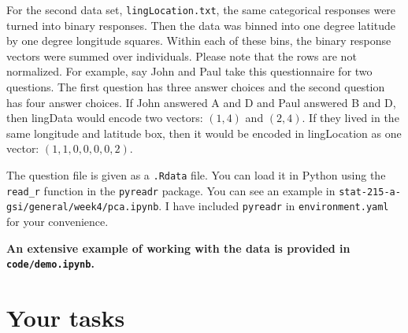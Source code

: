 \documentclass[letterpaper,12pt]{article}
\begin{document}
For the second data set, \texttt{lingLocation.txt}, the same categorical responses were turned into binary responses. Then the data was binned into one degree latitude by one degree longitude squares. Within each of these bins, the binary response vectors were summed over individuals. Please note that the rows are not normalized. For example, say John and Paul take this questionnaire for two questions. The first question has three answer choices and the second question has four answer choices. If John answered A and D and Paul answered B and D, then lingData would encode two vectors: $(1, 4)$ and $(2, 4)$. If they lived in the same longitude and latitude box, then it would be encoded in lingLocation as one vector: $(1, 1, 0, 0, 0, 0, 2)$.

The question file is given as a \texttt{.Rdata} file. You can load it in Python using the \texttt{read\_r} function in the \texttt{pyreadr} package. You can see an example in \texttt{stat-215-a-gsi/general/week4/pca.ipynb}. I have included \texttt{pyreadr} in \texttt{environment.yaml} for your convenience.

\textbf{An extensive example of working with the data is provided in \texttt{code/demo.ipynb}.}

\section{Your tasks}
\end{document}
